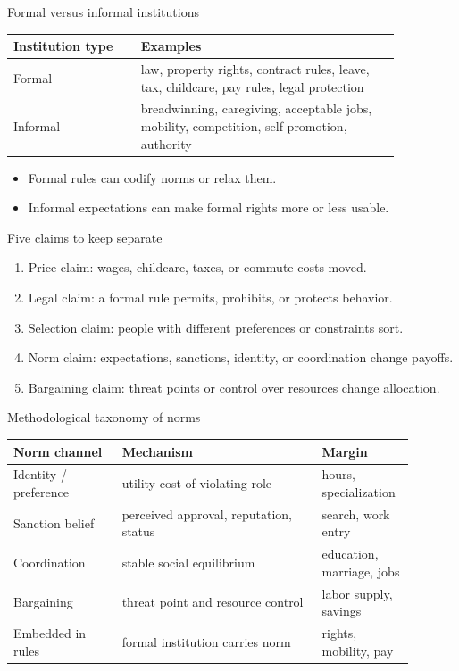\documentclass[aspectratio=169,11pt]{beamer}
\begin{document}
\begin{frame}{Formal versus informal institutions}
\small
\begin{tabular}{p{0.28\linewidth} p{0.58\linewidth}}
\toprule
Institution type & Examples \\
\midrule
Formal & law, property rights, contract rules, leave, tax, childcare, pay rules, legal protection \\
Informal & breadwinning, caregiving, acceptable jobs, mobility, competition, self-promotion, authority \\
\bottomrule
\end{tabular}
\vspace{0.5em}
\begin{itemize}
    \item Formal rules can codify norms or relax them.
    \item Informal expectations can make formal rights more or less usable.
\end{itemize}
\end{frame}

\begin{frame}{Five claims to keep separate}
\begin{enumerate}
    \item Price claim: wages, childcare, taxes, or commute costs moved.
    \item Legal claim: a formal rule permits, prohibits, or protects behavior.
    \item Selection claim: people with different preferences or constraints sort.
    \item Norm claim: expectations, sanctions, identity, or coordination change payoffs.
    \item Bargaining claim: threat points or control over resources change allocation.
\end{enumerate}
\end{frame}

\begin{frame}{Methodological taxonomy of norms}
\small
\begin{tabular}{p{0.25\linewidth} p{0.46\linewidth} p{0.18\linewidth}}
\toprule
Norm channel & Mechanism & Margin \\
\midrule
Identity / preference & utility cost of violating role & hours, specialization \\
Sanction belief & perceived approval, reputation, status & search, work entry \\
Coordination & stable social equilibrium & education, marriage, jobs \\
Bargaining & threat point and resource control & labor supply, savings \\
Embedded in rules & formal institution carries norm & rights, mobility, pay \\
\bottomrule
\end{tabular}
\end{frame}
\end{document}
